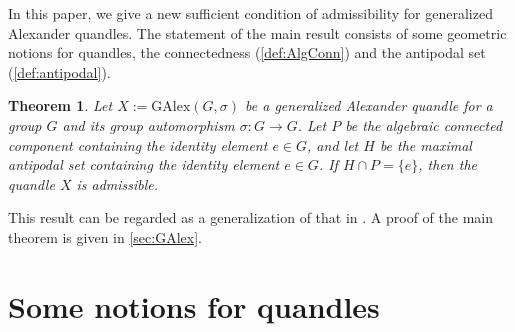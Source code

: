 \documentclass[dvipdfmx,12pt]{amsart}
\theoremstyle{plain}
\newtheorem{thm}{Theorem}[section]
\theoremstyle{definition}
\newcommand{\GAlex}{\mathrm{GAlex}}
\begin{document}
In this paper, we give a new sufficient condition of admissibility for generalized Alexander quandles. 
The statement of the main result consists of some geometric notions for quandles, the connectedness (\cref{def:AlgConn}) and the antipodal set (\cref{def:antipodal}).

\begin{thm}\label{thm:main_thm}
  Let $X := \GAlex(G, \sigma)$ be a generalized Alexander quandle for a group $G$ and its group automorphism $\sigma: G \to G$.
  Let $P$ be the algebraic connected component containing the identity element $e \in G$,
  and let $H$ be the maximal antipodal set containing the identity element $e \in G$.
  If $H \cap P = \{e\}$, then the quandle $X$ is admissible.
\end{thm}

This result can be regarded as a generalization of that in \cite{Dhanwani-2023-DehnQuandlesGroupsOrientable}.
A proof of the main theorem is given in \cref{sec:GAlex}.

\section{Some notions for quandles}
\end{document}
